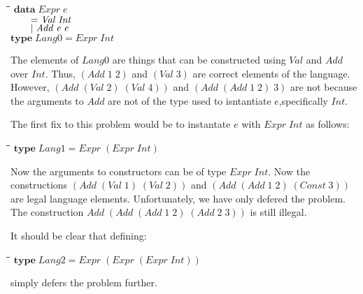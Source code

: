 \documentclass[11pt]{article}
\newlength{\lwidth}\setlength{\lwidth}{4.5cm}
\newlength{\cwidth}\setlength{\cwidth}{8mm} %
\newcommand{\Conid}[1]{\mathit{#1}}
\newcommand{\Varid}[1]{\mathit{#1}}
\begin{document}
\begin{tabbing}
\qquad\=\hspace{\lwidth}\=\hspace{\cwidth}\=\+\kill
${\mathbf{data}\;\Conid{Expr}\;\Varid{e}}$\\
${\hskip2.00em\relax\mathrel{=}\Conid{Val}\;\Conid{Int}}$\\
${\hskip2.00em\relax\mid \Conid{Add}\;\Varid{e}\;\Varid{e}}$\\
${}$\\
${\mathbf{type}\;\Conid{Lang0}\mathrel{=}\Conid{Expr}\;\Conid{Int}}$
\end{tabbing}
The elements of \ensuremath{\Conid{Lang0}} are things that can be constructed using \ensuremath{\Conid{Val}}
and \ensuremath{\Conid{Add}} over \ensuremath{\Conid{Int}}.  Thus, \ensuremath{(\Conid{Add}\;\mathrm{1}\;\mathrm{2})} and \ensuremath{(\Conid{Val}\;\mathrm{3})} are correct
elements of the language.  However, \ensuremath{(\Conid{Add}\;(\Conid{Val}\;\mathrm{2})\;(\Conid{Val}\;\mathrm{4}))} and \ensuremath{(\Conid{Add}\;(\Conid{Add}\;\mathrm{1}\;\mathrm{2})\;\mathrm{3})} are not because the arguments to \ensuremath{\Conid{Add}} are not of the
type used to isntantiate \ensuremath{\Varid{e}},specifically \ensuremath{\Conid{Int}}.

The first fix to this problem would be to instantate \ensuremath{\Varid{e}} with \ensuremath{\Conid{Expr}\;\Conid{Int}} as follows:

\begin{tabbing}
\qquad\=\hspace{\lwidth}\=\hspace{\cwidth}\=\+\kill
${\mathbf{type}\;\Conid{Lang1}\mathrel{=}\Conid{Expr}\;(\Conid{Expr}\;\Conid{Int})}$
\end{tabbing}
Now the arguments to constructors can be of type \ensuremath{\Conid{Expr}\;\Conid{Int}}.  Now the
constructions \ensuremath{(\Conid{Add}\;(\Conid{Val}\;\mathrm{1})\;(\Conid{Val}\;\mathrm{2}))} and \ensuremath{(\Conid{Add}\;(\Conid{Add}\;\mathrm{1}\;\mathrm{2})\;(\Conid{Const}\;\mathrm{3}))}
are legal language elements.  Unfortunately, we have only defered the
problem.  The construction \ensuremath{\Conid{Add}\;(\Conid{Add}\;(\Conid{Add}\;\mathrm{1}\;\mathrm{2})\;(\Conid{Add}\;\mathrm{2}\;\mathrm{3}))} is still
illegal.

It should be clear that defining:

\begin{tabbing}
\qquad\=\hspace{\lwidth}\=\hspace{\cwidth}\=\+\kill
${\mathbf{type}\;\Conid{Lang2}\mathrel{=}\Conid{Expr}\;(\Conid{Expr}\;(\Conid{Expr}\;\Conid{Int}))}$
\end{tabbing}
simply defers the problem further.
\end{document}
